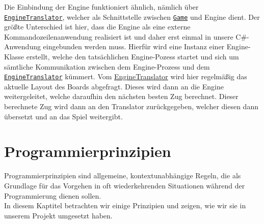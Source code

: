 \documentclass[
10pt, %
a4paper, %
oneside, %
headinclude,footinclude, %
BCOR5mm, %
]{scrartcl}
\begin{document}
\begin{onehalfspace}
Die Einbindung der Engine funktioniert ähnlich, nämlich über \texttt{\href{https://github.com/schmida736/Chess-AdvancedSE/blob/main/Chess-AdvancedSE/Translators/EngineTranslator.cs}{EngineTranslator}}, welcher als Schnittstelle zwischen \texttt{\href{https://github.com/schmida736/Chess-AdvancedSE/blob/main/Chess-AdvancedSE/Game\%20Elements/Game.cs}{Game}} und Engine dient. Der größte Unterschied ist hier, dass die Engine als eine externe Kommandozeilenanwendung realisiert ist und daher erst einmal in unsere C\#-Anwendung eingebunden werden muss.
Hierfür wird eine Instanz einer Engine-Klasse erstellt, welche den tatsächlichen Engine-Pozess startet und sich um sämtliche Kommunikation zwischen dem Engine-Prozess und dem \texttt{\href{https://github.com/schmida736/Chess-AdvancedSE/blob/main/Chess-AdvancedSE/Translators/EngineTranslator.cs}{EngineTranslator}} kümmert. Vom \href{https://github.com/schmida736/Chess-AdvancedSE/blob/main/Chess-AdvancedSE/Translators/EngineTranslator.cs}{EngineTranslator} wird hier regelmäßig das aktuelle Layout des Boards abgefragt. Dieses wird dann an die Engine weitergeleitet, welche daraufhin den nächsten besten Zug berechnet. Dieser berechnete Zug wird dann an den Translator zurückgegeben, welcher diesen dann übersetzt und an das Spiel weitergibt.
\newpage
\section{Programmierprinzipien}
Programmierprinzipien sind allgemeine, kontextunabhängige Regeln, die als Grundlage für das Vorgehen in oft wiederkehrenden Situationen während der Programmierung dienen sollen.\\
In diesem Kaptitel betrachten wir einige Prinzipien und zeigen, wie wir sie in unserem Projekt umgesetzt haben.

\end{onehalfspace}
\end{document}
